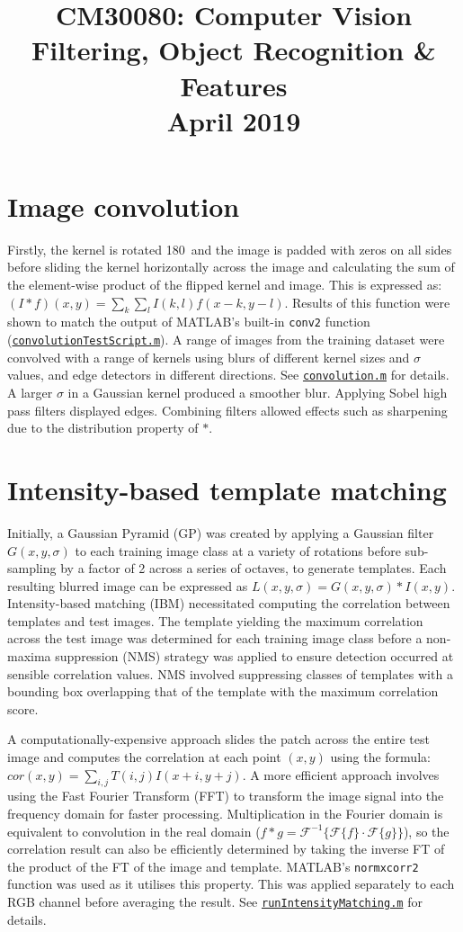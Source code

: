 \documentclass[11pt]{article}
\date{}
\author{}
\title{{\color{indigo}\textbf{CM30080: Computer Vision}}\\\small \textbf{Filtering, Object Recognition \& Features\\April 2019}\vspace{-15ex}}
\begin{document}
\normalsize
\pgfplotsset{compat=1.16}

\setlength{\multicolsep}{19pt}
\begin{multicols}{2}

{\color{indigo}
\section{Image convolution}}
Firstly, the kernel is rotated 180\textdegree \ and the image is padded with zeros on all sides before sliding the kernel horizontally across the image and calculating the sum of the element-wise product of the flipped kernel and image. This is expressed as: $(I*f)(x,y)=\sum_{k}\sum_{l}I(k,l)f(x-k,y-l)$. Results of this function were shown to match the output of MATLAB's built-in \texttt{conv2} function (\texttt{\hyperlink{convolutionTestScript.m}{convolutionTestScript.m}}). A range of images from the training dataset were convolved with a range of kernels using blurs of different kernel sizes and $\sigma$ values, and edge detectors in different directions. See \texttt{\hyperlink{convolution.m}{convolution.m}} for details. A larger $\sigma$ in a Gaussian kernel produced a smoother blur. Applying Sobel high pass filters displayed edges. Combining filters allowed effects such as sharpening due to the distribution property of $*$.

{\color{indigo}
\section{Intensity-based template matching}}
Initially, a Gaussian Pyramid (GP) was created by applying a Gaussian filter $G(x,y,\sigma)$ to each training image class at a variety of rotations before sub-sampling by a factor of 2 across a series of octaves, to generate templates. Each resulting blurred image can be expressed as $L(x,y,\sigma)=G(x,y,\sigma)*I(x,y)$. Intensity-based matching (IBM) necessitated computing the correlation between templates and test images. The template yielding the maximum correlation across the test image was determined for each training image class before a non-maxima suppression (NMS) strategy was applied to ensure detection occurred at sensible correlation values. NMS involved suppressing classes of templates with a bounding box overlapping that of the template with the maximum correlation score.

A computationally-expensive approach slides the patch across the entire test image and computes the correlation at each point $(x,y)$ using the formula: $cor(x,y)=\sum_{i,j}T(i,j)I(x+i,y+j)$. A more efficient approach involves using the Fast Fourier Transform (FFT) to transform the image signal into the frequency domain for faster processing. Multiplication in the Fourier domain is equivalent to convolution in the real domain ($f*g=\mathcal{F}^{-1}\{ \mathcal{F}\{f\} \cdot \mathcal{F}\{g\} \}$), so the correlation result can also be efficiently determined by taking the inverse FT of the product of the FT of the image and template. MATLAB's \texttt{normxcorr2} function was used as it utilises this property. This was applied separately to each RGB channel before averaging the result. See \texttt{\hyperlink{runIntensityMatching.m}{runIntensityMatching.m}} for details.


\end{multicols}
\end{document}
